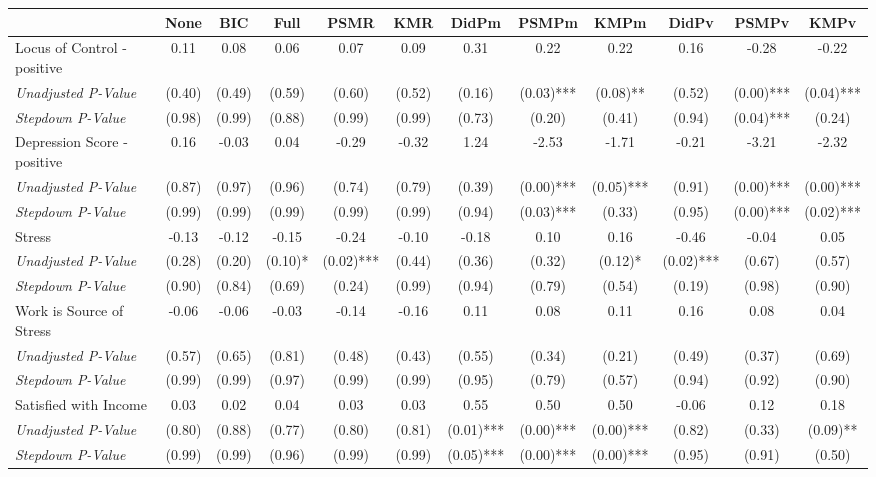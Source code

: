 \begin{tabular}{l c c c c c c c c c c c}
\toprule
 & None & BIC & Full & PSMR & KMR & DidPm & PSMPm & KMPm & DidPv & PSMPv & KMPv \\
\midrule
Locus of Control - positive & 0.11 & 0.08 & 0.06 & 0.07 & 0.09 & 0.31 & 0.22 & 0.22 & 0.16 & -0.28 & -0.22 \\
\quad \textit{Unadjusted P-Value} & (0.40) & (0.49) & (0.59) & (0.60) & (0.52) & (0.16) & (0.03)*** & (0.08)** & (0.52) & (0.00)*** & (0.04)*** \\
\quad \textit{Stepdown P-Value} & (0.98) & (0.99) & (0.88) & (0.99) & (0.99) & (0.73) & (0.20) & (0.41) & (0.94) & (0.04)*** & (0.24) \\
Depression Score - positive & 0.16 & -0.03 & 0.04 & -0.29 & -0.32 & 1.24 & -2.53 & -1.71 & -0.21 & -3.21 & -2.32 \\
\quad \textit{Unadjusted P-Value} & (0.87) & (0.97) & (0.96) & (0.74) & (0.79) & (0.39) & (0.00)*** & (0.05)*** & (0.91) & (0.00)*** & (0.00)*** \\
\quad \textit{Stepdown P-Value} & (0.99) & (0.99) & (0.99) & (0.99) & (0.99) & (0.94) & (0.03)*** & (0.33) & (0.95) & (0.00)*** & (0.02)*** \\
Stress & -0.13 & -0.12 & -0.15 & -0.24 & -0.10 & -0.18 & 0.10 & 0.16 & -0.46 & -0.04 & 0.05 \\
\quad \textit{Unadjusted P-Value} & (0.28) & (0.20) & (0.10)* & (0.02)*** & (0.44) & (0.36) & (0.32) & (0.12)* & (0.02)*** & (0.67) & (0.57) \\
\quad \textit{Stepdown P-Value} & (0.90) & (0.84) & (0.69) & (0.24) & (0.99) & (0.94) & (0.79) & (0.54) & (0.19) & (0.98) & (0.90) \\
Work is Source of Stress & -0.06 & -0.06 & -0.03 & -0.14 & -0.16 & 0.11 & 0.08 & 0.11 & 0.16 & 0.08 & 0.04 \\
\quad \textit{Unadjusted P-Value} & (0.57) & (0.65) & (0.81) & (0.48) & (0.43) & (0.55) & (0.34) & (0.21) & (0.49) & (0.37) & (0.69) \\
\quad \textit{Stepdown P-Value} & (0.99) & (0.99) & (0.97) & (0.99) & (0.99) & (0.95) & (0.79) & (0.57) & (0.94) & (0.92) & (0.90) \\
Satisfied with Income & 0.03 & 0.02 & 0.04 & 0.03 & 0.03 & 0.55 & 0.50 & 0.50 & -0.06 & 0.12 & 0.18 \\
\quad \textit{Unadjusted P-Value} & (0.80) & (0.88) & (0.77) & (0.80) & (0.81) & (0.01)*** & (0.00)*** & (0.00)*** & (0.82) & (0.33) & (0.09)** \\
\quad \textit{Stepdown P-Value} & (0.99) & (0.99) & (0.96) & (0.99) & (0.99) & (0.05)*** & (0.00)*** & (0.00)*** & (0.95) & (0.91) & (0.50) \\

\end{tabular}
